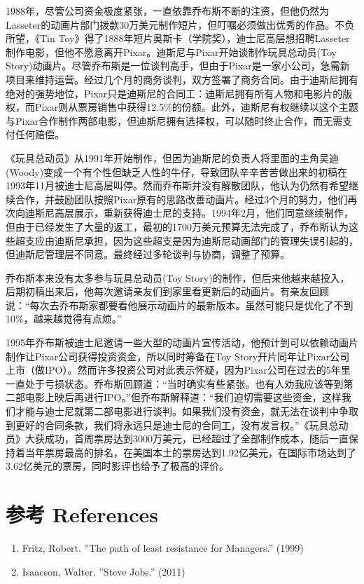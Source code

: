 1988年，尽管公司资金极度紧张，一直依靠乔布斯不断的注资，但他仍然为Lasseter的动画片部门拨款30万美元制作短片，但叮嘱必须做出优秀的作品。不负所望，《Tin Toy》得了1888年短片奥斯卡（学院奖），迪士尼高层想招聘Lasseter制作电影，但他不愿意离开Pixar。迪斯尼与Pixar开始谈制作玩具总动员(Toy Story)动画片。尽管乔布斯是一位谈判高手，但由于Pixar是一家小公司，急需新项目来维持运营。经过几个月的商务谈判，双方签署了商务合同。由于迪斯尼拥有绝对的强势地位，Pixar只是迪斯尼的合同工：迪斯尼拥有所有人物和电影片的版权，而Pixar则从票房销售中获得12.5\%的份额。此外，迪斯尼有权继续以这个主题与Pixar合作制作两部电影，但迪斯尼拥有选择权，可以随时终止合作，而无需支付任何赔偿。

《玩具总动员》从1991年开始制作，但因为迪斯尼的负责人将里面的主角吴迪(Woody)变成一个有个性但缺乏人性的牛仔，导致团队辛辛苦苦做出来的初稿在1993年11月被迪士尼高层叫停。然而乔布斯并没有解散团队，他认为仍然有希望继续合作，并鼓励团队按照Pixar原有的思路改善动画片。经过3个月的努力，他们再次向迪斯尼高层展示，重新获得迪士尼的支持。1994年2月，他们同意继续制作，但由于已经发生了大量的返工，最初的1700万美元预算无法完成了，乔布斯认为这些超支应由迪斯尼承担，因为这些超支是因为迪斯尼动画部门的管理失误引起的，但迪斯尼管理层不同意。最终经过多轮谈判与协商，调整了预算。

乔布斯本来没有太多参与玩具总动员(Toy Story)的制作，但后来他越来越投入，后期初稿出来后，他每次邀请亲友们到家里看更新后的动画片。有亲友回顾说：“每次去乔布斯家都要看他展示动画片的最新版本。虽然可能只是优化了不到10\%，越来越觉得有点烦。”

1995年乔布斯被迪士尼邀请一些大型的动画片宣传活动，他预计到可以依赖动画片制作让Pixar公司获得投资资金，所以同时筹备在Toy Story开片同年让Pixar公司上市（做IPO）。然而许多投资公司对此表示怀疑，因为Pixar公司在过去的5年里一直处于亏损状态。乔布斯回顾道：“当时确实有些紧张。也有人劝我应该等到第二部电影上映后再进行IPO。”但乔布斯解释道：“我们迫切需要这些资金，这样我们才能与迪士尼就第二部电影进行谈判。如果我们没有资金，就无法在谈判中争取到更好的合同条款，我们将永远只是迪士尼的合同工，没有发言权。”《玩具总动员》大获成功，首周票房达到3000万美元，已经超过了全部制作成本，随后一直保持着当年票房最高的排名，在美国本土的票房达到1.92亿美元，在国际市场达到了3.62亿美元的票房，同时影评也给予了极高的评价。

\hypertarget{ux9644ux4ef6}{%
\section{参考 References}\label{ux9644ux4ef6}}

\begin{enumerate}
\tightlist
\item
  Fritz, Robert. ''The path of least resistance for Managers.'' (1999)
\item
  Isaacson, Walter. ''Steve Jobs.'' (2011)
\end{enumerate}




